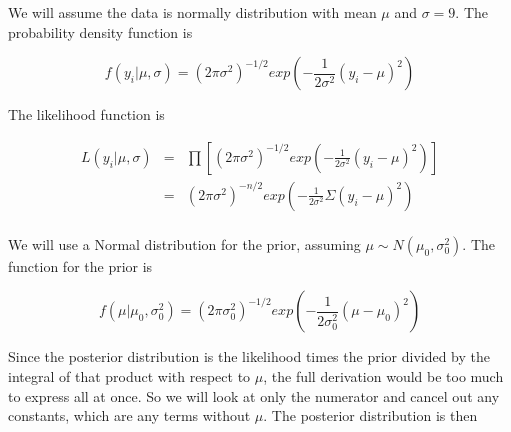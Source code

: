 \documentclass[12pt]{article}
\begin{document}
\noindent We will assume the data is normally distribution with mean $\mu$ and $\sigma=9$.  The probability density function is

\[f(y_i|\mu,\sigma)=(2\pi\sigma^2)^{-1/2}exp\left(-\frac{1}{2\sigma^2}(y_i-\mu)^2\right)\]

\noindent The likelihood function is

\begin{eqnarray*}
L(y_i|\mu,\sigma) &=& \prod\left[(2\pi\sigma^2)^{-1/2}exp\left(-\frac{1}{2\sigma^2}(y_i-\mu)^2\right)\right] \\
&=& (2\pi\sigma^2)^{-n/2}exp\left(-\frac{1}{2\sigma^2}\Sigma(y_i-\mu)^2\right) \\
\end{eqnarray*}

\noindent We will use a Normal distribution for the prior, assuming $\mu\sim N(\mu_0,\sigma_0^2)$.  The function for the prior is

\[f(\mu|\mu_0,\sigma_0^2)= (2\pi\sigma_0^2)^{-1/2}exp\left(-\frac{1}{2\sigma_0^2}(\mu-\mu_0)^2\right)\]

\noindent Since the posterior distribution is the likelihood times the prior divided by the integral of that product with respect to $\mu$, the full derivation would be too much to express all at once.  So we will look at only the numerator and cancel out any constants, which are any terms without $\mu$.  The posterior distribution is then
\end{document}
